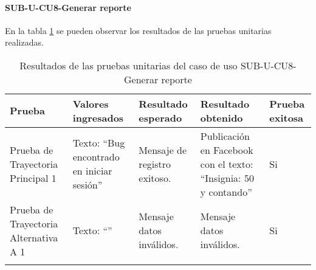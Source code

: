 \paragraph{SUB-U-CU8-Generar reporte}\label{SUB-U-CU8:Pruebas}
En la tabla \ref{pruebas_unitarias_sub-u-cu8} se pueden observar los resultados de las pruebas unitarias realizadas.
\begin{longtable}{|M{2cm}| M{4.5cm}|M{3cm}|M{3cm}|M{1.5cm}|}
	\hline
	\textbf{Prueba} & \textbf{Valores ingresados} & \textbf{Resultado esperado} & \textbf{Resultado obtenido} & \textbf{Prueba exitosa} \\ \hline
	Prueba de Trayectoria Principal 1 & Texto: ``Bug encontrado en iniciar sesión''
	& 
	Mensaje de registro exitoso.
	&
	Publicación en Facebook con el texto: ``Insignia: 50 y contando''
	& Si \\ \hline

	Prueba de Trayectoria Alternativa A 1& Texto: ``''
	& 
	Mensaje datos inválidos.
	&
	Mensaje datos inválidos.
	& Si \\ \hline

	\caption{Resultados de las pruebas unitarias del caso de uso SUB-U-CU8-Generar reporte}
	\label{pruebas_unitarias_sub-u-cu8}
\end{longtable}